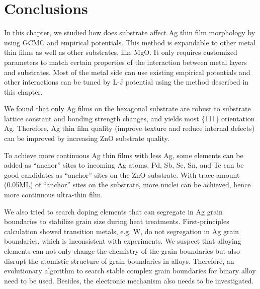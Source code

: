 \section{Conclusions}
In this chapter, we studied how does substrate affect Ag thin film morphology by using \ac{GCMC} and empirical potentials. This method is expandable to other metal thin films as well as other substrates, like MgO. It only requires customized parameters to match certain properties of the interaction between metal layers and substrates. Most of the metal side can use existing empirical potentials and other interactions can be tuned by L-J potential using the method described in this chapter.

We found that only Ag films on the hexagonal substrate are robust to substrate lattice constant and bonding strength changes, and yields most \{111\} orientation Ag. Therefore, Ag thin film quality (improve texture and reduce internal defects) can be improved by increasing ZnO substrate quality.

To achieve more continuous Ag thin films with less Ag, some elements can be added as ``anchor'' sites to incoming Ag atoms. Pd, Sb, Se, Sn, and Te can be good candidates as ``anchor'' sites on the ZnO substrate. With trace amount (0.05\ac{ML}) of ``anchor'' sites on the substrate, more nuclei can be achieved, hence more continuous ultra-thin film.

We also tried to search doping elements that can segregate in Ag grain boundaries to stabilize grain size during heat treatments. First-principles calculation showed transition metals, e.g. W, do not segregation in Ag grain boundaries, which is inconsistent with experiments. We suspect that alloying elements can not only change the chemistry of the grain boundaries but also disrupt the atomistic structure of grain boundaries in alloys. Therefore, an evolutionary algorithm to search stable complex grain boundaries for binary alloy need to be used. Besides, the electronic mechanism also needs to be investigated.